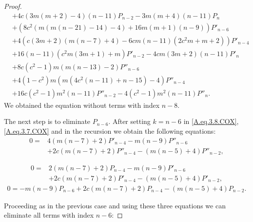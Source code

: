 \documentclass[review,nopreprintline]{elsarticle}
\theoremstyle{definition}
\numberwithin{equation}{section}
\theoremstyle{remark}
\begin{document}
\begin{proof}
\begin{align*}
	            &+4 c (3 m (m+2)-4) (n-11) P_{n-2} -3 m (m+4) (n-11) P_n \\
	            &+\left(8 c^2 (m (m (n-21)-14)-4)+16 m (m+1) (n-9)\right) P'_{n-6} \\
	            &+4 \left(c (3 m+2) (m (n-7)+4)-6 c m (n-11) \left(2 c^2 m+m+2\right)\right) P'_{n-4} \\
	            &+16 (n-11) \left(c^2 m (3 m+1)+m\right) P'_{n-2} -4 c m (3 m+2) (n-11)  P'_n \\
	            &+8 c \left(c^2-1\right) m (m (n-13)-2) P''_{n-6} \\
	            &+4 \left(1-c^2\right) m \left(m \left(4 c^2 (n-11)+n-15\right)-4\right) P''_{n-4} \\
	            &+16 c \left(c^2-1\right) m^2 (n-11) P''_{n-2} -4 \left(c^2-1\right) m^2 (n-11) P''_n .
	        \end{align*}
	        We obtained the equation without terms with index $n-8$. 
	        
	  The next step is to eliminate  $P_{n-6}$. After setting $k=n-6$ in \eqref{A.eq.3.8.COX}, \eqref{A.eq.3.7.COX} and in the recursion we obtain the following equations:
	        \begin{align}
	            0=&4 (m (n-7)+2) P'_{n-4} -m (n-9) P''_{n-6} \nonumber\\
	            &+2 c (m (n-7)+2) P''_{n-4} -(m (n-5)+4) P''_{n-2},
	        \end{align}
	        
	        \begin{align}
	            0=&2 (m (n-7)+2) P_{n-4} -m (n-9) P'_{n-6} \nonumber\\
	            &+2 c (m (n-7)+2) P'_{n-4} -(m (n-5)+4) P'_{n-2},
	        \end{align}
	         \begin{align*}
	            0=-m (n-9) P_{n-6} +2 c (m (n-7)+2) P_{n-4} -(m (n-5)+4) P_{n-2}.
	        \end{align*}
	        
	        Proceeding as in the previous case and using these three equations we can eliminate 
	        all terms with index $n-6$: 
	

\end{proof}
\end{document}
